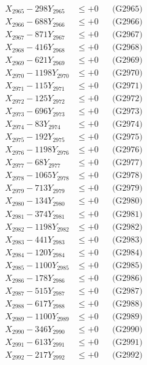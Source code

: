 \documentclass[a4paper,10pt]{article}
\begin{document}
{\begin{align}
X_{2965} - 298Y_{2965} &\leq +0 && \text{(G2965)} \\
X_{2966} - 688Y_{2966} &\leq +0 && \text{(G2966)} \\
X_{2967} - 871Y_{2967} &\leq +0 && \text{(G2967)} \\
X_{2968} - 416Y_{2968} &\leq +0 && \text{(G2968)} \\
X_{2969} - 621Y_{2969} &\leq +0 && \text{(G2969)} \\
X_{2970} - 1198Y_{2970} &\leq +0 && \text{(G2970)} \\
\allowbreak
X_{2971} - 115Y_{2971} &\leq +0 && \text{(G2971)} \\
X_{2972} - 125Y_{2972} &\leq +0 && \text{(G2972)} \\
X_{2973} - 696Y_{2973} &\leq +0 && \text{(G2973)} \\
X_{2974} - 83Y_{2974} &\leq +0 && \text{(G2974)} \\
X_{2975} - 192Y_{2975} &\leq +0 && \text{(G2975)} \\
X_{2976} - 1198Y_{2976} &\leq +0 && \text{(G2976)} \\
X_{2977} - 68Y_{2977} &\leq +0 && \text{(G2977)} \\
X_{2978} - 1065Y_{2978} &\leq +0 && \text{(G2978)} \\
X_{2979} - 713Y_{2979} &\leq +0 && \text{(G2979)} \\
X_{2980} - 134Y_{2980} &\leq +0 && \text{(G2980)} \\
\allowbreak
X_{2981} - 374Y_{2981} &\leq +0 && \text{(G2981)} \\
X_{2982} - 1198Y_{2982} &\leq +0 && \text{(G2982)} \\
X_{2983} - 441Y_{2983} &\leq +0 && \text{(G2983)} \\
X_{2984} - 120Y_{2984} &\leq +0 && \text{(G2984)} \\
X_{2985} - 1100Y_{2985} &\leq +0 && \text{(G2985)} \\
X_{2986} - 178Y_{2986} &\leq +0 && \text{(G2986)} \\
X_{2987} - 515Y_{2987} &\leq +0 && \text{(G2987)} \\
X_{2988} - 617Y_{2988} &\leq +0 && \text{(G2988)} \\
X_{2989} - 1100Y_{2989} &\leq +0 && \text{(G2989)} \\
X_{2990} - 346Y_{2990} &\leq +0 && \text{(G2990)} \\
\allowbreak
X_{2991} - 613Y_{2991} &\leq +0 && \text{(G2991)} \\
X_{2992} - 217Y_{2992} &\leq +0 && \text{(G2992)} \\

\end{align}}
\end{document}
